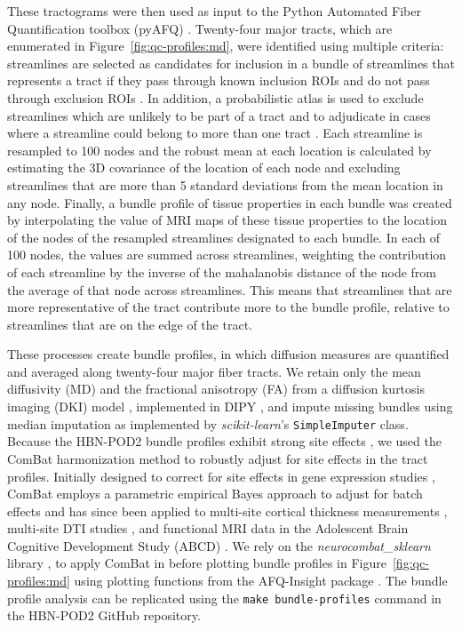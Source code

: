 \documentclass[9pt,lineno]{elife}
\begin{document}
These tractograms were then used as input to the Python Automated Fiber
Quantification toolbox (pyAFQ) \citep{kruper2021evaluating}. Twenty-four major
tracts, which are enumerated in Figure~\ref{fig:qc-profiles:md}, were identified using
multiple criteria: streamlines are selected as candidates for inclusion in a
bundle of streamlines that represents a tract if they pass through known
inclusion ROIs and do not pass through exclusion ROIs \citep{Wakana2007-nw}. In
addition, a probabilistic atlas is used to exclude streamlines which are
unlikely to be part of a tract and to adjudicate in cases where a streamline
could belong to more than one tract \citep{Hua2008-di}. Each streamline is
resampled to 100 nodes and the robust mean at each location is calculated by
estimating the 3D covariance of the location of each node and excluding
streamlines that are more than 5 standard deviations from the mean location in
any node. Finally, a bundle profile of tissue properties in each bundle was
created by interpolating the value of MRI maps of these tissue properties to the
location of the nodes of the resampled streamlines designated to each bundle. In
each of 100 nodes, the values are summed across streamlines, weighting the
contribution of each streamline by the inverse of the mahalanobis distance of
the node from the average of that node across streamlines. This means that
streamlines that are more representative of the tract contribute more to the
bundle profile, relative to streamlines that are on the edge of the tract.

These processes create bundle profiles, in which diffusion measures are
quantified and averaged along twenty-four major fiber tracts. We retain only the
mean diffusivity (MD) and the fractional anisotropy (FA) from a diffusion
kurtosis imaging (DKI) model \citep{jensen2005-ta}, implemented in DIPY \citep{Henriques2021-lk}, and impute missing bundles
using median imputation as implemented by \emph{scikit-learn}'s
\texttt{SimpleImputer} class. 
Because the HBN-POD2 bundle
profiles exhibit strong site effects \citep{richie-halford2021multidimensional},
we used the ComBat harmonization method to robustly adjust for site effects in
the tract profiles. Initially designed to correct for site effects in gene
expression studies \citep{Johnson2007-kl}, ComBat employs a parametric empirical
Bayes approach to adjust for batch effects and has since been applied to
multi-site cortical thickness measurements \citep{fortin2018-hk}, multi-site DTI
studies \citep{fortin2017-be}, and functional MRI data in the Adolescent Brain
Cognitive Development Study (ABCD) \citep{nielson2018detecting}. We rely on the
\emph{neurocombat\_sklearn} library \citep{neurocombat-sklearn}, to apply ComBat in
before plotting bundle profiles in Figure~\ref{fig:qc-profiles:md} using
plotting functions from the AFQ-Insight package
\citep{richie-halford2019insight}. The bundle profile analysis can be replicated
using the \texttt{make bundle-profiles} command in the HBN-POD2 GitHub
repository.
\end{document}

